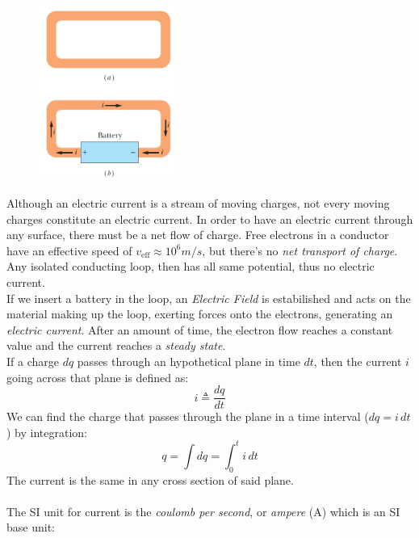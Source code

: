 \documentclass[12pt, a4paper]{article}
\begin{document}
		\begin{figure}
			\centering
			\includegraphics[width=4.5cm]{Physics2_PNGs/elec-current.png}
			\caption*{}
			\label{fig:elec-current.png}
		\end{figure}
		Although an electric current is a stream of moving charges, not every moving charges constitute an electric current. In order to have an electric current through any surface, there must be a net flow of charge. 
		Free electrons in a conductor have an effective speed of 
		$v_{\text{eff}} \approx 10^6 m/s$, but there's no \textit{net transport of charge}. \\
		Any isolated conducting loop, then has all same potential, thus no electric current. \\ 
		If we insert a battery in the loop, an \textit{Electric Field} is estabilished and acts on the material making up the loop, exerting forces onto the electrons, generating an \textit{electric current}. After an amount of time, the electron flow reaches a constant value and the current reaches a \textit{steady state}. \\
		If a charge $dq$ passes through an hypothetical plane in time $dt$, then the current $i$ going across that plane is defined as:
		\begin{equation*}
			i \triangleq \frac{dq}{dt}
			\tag{Definition of Current, 6-1}
		\end{equation*}
		We can find the charge that passes through the plane in a time interval
		($dq = i \, dt$) by integration:
		\[
			q = \int dq = \int_{0}^{t} i \, dt
			\tag{6-2}
		\]
		The current is the same in any cross section of said plane. \\ \\
		The SI unit for current is the \textit{coulomb per second}, or \textit{ampere} (A) which is an SI base unit:
\end{document}

